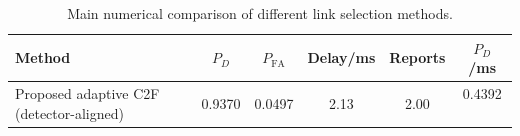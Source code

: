\begin{table}[t]
    \centering
    \caption{Main numerical comparison of different link selection methods.}
    \label{tab:main_summary}
    \begin{tabular}{l c c c c c}
        \hline
        Method & $P_D$ & $P_{\mathrm{FA}}$ & Delay/ms & Reports & $P_D$/ms \\
        \hline
        Proposed adaptive C2F (detector-aligned) & 0.9370 & 0.0497 & 2.13 & 2.00 & 0.4392 \
        \hline
    \end{tabular}
\end{table}
